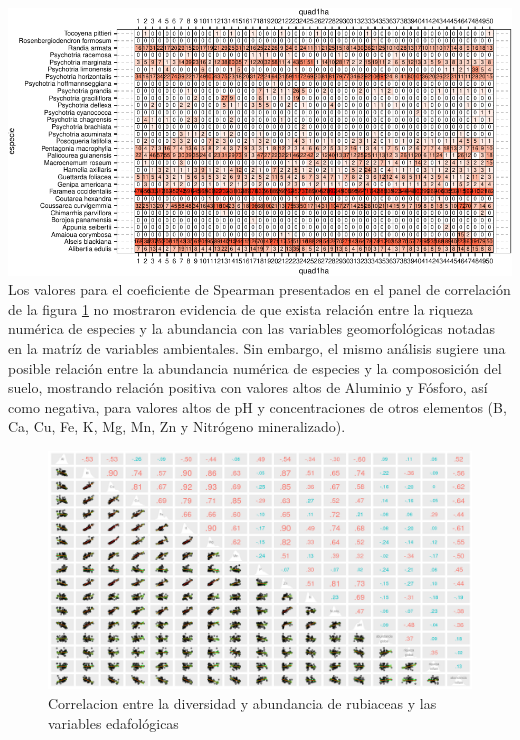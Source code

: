 \documentclass[11pt,]{article}
\begin{document}
\includegraphics{manuscrito_files/figure-latex/unnamed-chunk-3-1.pdf}
Los valores para el coeficiente de Spearman presentados en el panel de
correlación de la figura \ref{fig:panel_cor_suelo_abun_riq_rubic} no
mostraron evidencia de que exista relación entre la riqueza numérica de
especies y la abundancia con las variables geomorfológicas notadas en la
matríz de variables ambientales. Sin embargo, el mismo análisis sugiere
una posible relación entre la abundancia numérica de especies y la
compososición del suelo, mostrando relación positiva con valores altos
de Aluminio y Fósforo, así como negativa, para valores altos de pH y
concentraciones de otros elementos (B, Ca, Cu, Fe, K, Mg, Mn, Zn y
Nitrógeno mineralizado).

\begin{figure}
\centering
\includegraphics{panel_cor_suelo_abun_riq_rubic_spear.png}
\caption{Correlacion entre la diversidad y abundancia de rubiaceas y las
variables edafológicas \label{fig:panel_cor_suelo_abun_riq_rubic}}
\end{figure}
\end{document}
